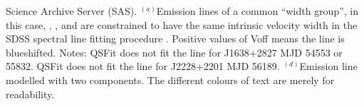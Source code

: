 \documentclass[a4paper,fleqn,usenatbib]{mnras}
\begin{document}
\begin{table}
{      Science Archive Server (SAS).
          $^{(a)}$Emission lines of a common ``width group'', in this case,
    , ,  and  are constrained to have
    the same intrinsic velocity width in the SDSS spectral line fitting
    procedure \citep{Bolton2012}. 
      Positive values of Voff means the line is blueshifted.
      Notes: QSFit does not fit the \mgii line for J1638+2827 MJD
      54553 or 55832. QSFit does not fit the \civ line for J2228+2201 MJD 56189.
      $^{(d)}$Emission line modelled with two components.
      The different colours of text are merely for readability.
    }
 \label{tab: QSFIT_line_values}
\end{table}


\end{document}
